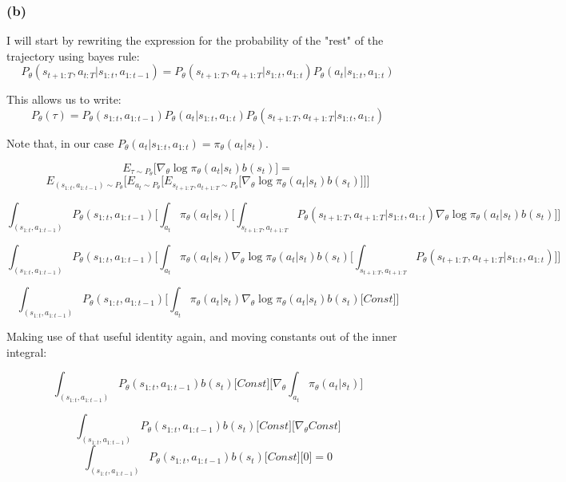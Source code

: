 \documentclass[a4paper]{article}
\begin{document}
\subsubsection*{(b)}
I will start by rewriting the expression for the probability of the "rest" of the trajectory using bayes rule:
$$P_\theta(s_{t+1:T}, a_{t:T}|s_{1:t}, a_{1:t-1}) = P_\theta(s_{t+1:T}, a_{t+1:T}|s_{1:t}, a_{1:t})P_\theta(a_t | s_{1:t}, a_{1:t})$$

This allows us to write:
$$P_\theta(\tau) = P_\theta(s_{1:t}, a_{1:t-1}) P_\theta(a_t | s_{1:t}, a_{1:t}) P_\theta(s_{t+1:T}, a_{t+1:T}|s_{1:t}, a_{1:t})$$

Note that, in our case $P_\theta(a_t | s_{1:t}, a_{1:t}) = \pi_\theta(a_t|s_t)$.

$$E_{\tau \sim P_\theta} \bigg[  \nabla_\theta \log \pi_\theta (a_t|s_t) b(s_t) \bigg] =$$
$$E_{(s_{1:t}, a_{1:t-1}) \sim P_\theta} \bigg[ E_{a_t \sim P_\theta} \big[E_{s_{t+1:T}, a_{t+1:T} \sim P_\theta} \big[ \nabla_\theta \log \pi_\theta (a_t|s_t) b(s_t) \big]\big] \bigg]$$

$$\int_{(s_{1:t}, a_{1:t-1})}P_\theta(s_{1:t}, a_{1:t-1}) \bigg[ \int_{a_t} \pi_\theta(a_t|s_t) \big[\int_{s_{t+1:T}, a_{t+1:T}} P_\theta(s_{t+1:T}, a_{t+1:T}|s_{1:t}, a_{1:t})  \nabla_\theta \log \pi_\theta (a_t|s_t) b(s_t) \big] \bigg]$$

$$\int_{(s_{1:t}, a_{1:t-1})}P_\theta(s_{1:t}, a_{1:t-1}) \bigg[ \int_{a_t} \pi_\theta(a_t|s_t) \nabla_\theta \log \pi_\theta (a_t|s_t) b(s_t) \big[\int_{s_{t+1:T}, a_{t+1:T}} P_\theta(s_{t+1:T}, a_{t+1:T}|s_{1:t}, a_{1:t}) \big] \bigg]$$

$$\int_{(s_{1:t}, a_{1:t-1})}P_\theta(s_{1:t}, a_{1:t-1}) \bigg[ \int_{a_t} \pi_\theta(a_t|s_t) \nabla_\theta \log \pi_\theta (a_t|s_t) b(s_t) \big[Const\big] \bigg]$$

Making use of that useful identity again, and moving constants out of the inner integral:

$$\int_{(s_{1:t}, a_{1:t-1})}P_\theta(s_{1:t}, a_{1:t-1}) b(s_t) \big[Const\big] \bigg[ \nabla_\theta \int_{a_t} \pi_\theta (a_t|s_t) \bigg]$$

$$\int_{(s_{1:t}, a_{1:t-1})}P_\theta(s_{1:t}, a_{1:t-1}) b(s_t) \big[Const\big] \bigg[ \nabla_\theta Const \bigg]$$
$$\int_{(s_{1:t}, a_{1:t-1})}P_\theta(s_{1:t}, a_{1:t-1}) b(s_t) \big[Const\big] \bigg[0 \bigg] = 0$$
\end{document}
